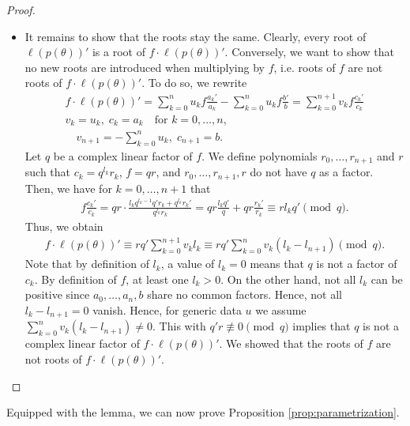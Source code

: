 \begin{proof}
\begin{itemize}
        \item It remains to show that the roots stay the same. Clearly, every root of \( \ell(p(\theta))' \) is a root of \( f \cdot \ell(p(\theta))' \). Conversely, we want to show that no new roots are introduced when multiplying by \( f \), i.e. roots of \( f \) are not roots of \(  f \cdot \ell(p(\theta))' \). To do so, we rewrite 
        \begin{gather*}
            f \cdot \ell(p(\theta))' = \sum_{k=0}^n u_k f \frac{a_k'}{a_k} - \sum_{k=0}^n u_k f \frac{b'}{b} = \sum_{k=0}^{n + 1} v_k f \frac{c_k'}{c_k}\\
            v_k = u_k, \; c_k = a_k \quad \text{for } k = 0, \dots, n,\\ \quad v_{n+1} = - \sum_{k=0}^n u_k, \; c_{n+1} = b.
        \end{gather*}
        Let \( q \) be a complex linear factor of \( f \). We define polynomials \( r_0, \dots, r_{n+1} \) and \( r \) such that \( c_k = q^{l_k}r_k \), \( f = q r \), and \( r_0, \dots, r_{n+1}, r \) do not have \( q \) as a factor. Then, we have for \(  k = 0, \dots, n+1 \) that
        \begin{gather*}
            f \frac{c_k'}{c_k} = q r \cdot \frac{l_k q^{l_k - 1} q'r_k +  q^{l_k}r_k'}{q^{l_k}r_k} = q r\frac{l_k q' }{q} + q r\frac{r_k'}{r_k} \equiv rl_k q' \pmod q.
        \end{gather*}
        Thus, we obtain 
        \begin{align*}
            f \cdot \ell(p(\theta))' \equiv rq'\sum_{k=0}^{n + 1} v_k l_k \equiv rq' \sum_{k=0}^{n } v_k(l_k - l_{n+1}) \pmod q.
        \end{align*}
        Note that by definition of \( l_k \), a value of \( l_k = 0 \) means that \( q \) is not a factor of \( c_k \). By definition of \( f \), at least one \( l_k > 0 \). On the other hand, not all \( l_k \) can be positive since \( a_0, \dots, a_n, b \) share no common factors. Hence, not all \( l_k - l_{n+1} = 0 \) vanish. Hence, for generic data \( u \) we assume \( \sum_{k=0}^{n } v_k(l_k - l_{n+1}) \neq 0 \). This with \( q'r \not \equiv 0 \pmod q \) implies that \( q \) is not a complex linear factor of \( f \cdot \ell(p(\theta))' \). We showed that the roots of \( f \) are not roots of \( f \cdot \ell(p(\theta))' \).
    \end{itemize}
\end{proof}

Equipped with the lemma, we can now prove Proposition \ref{prop:parametrization}.

